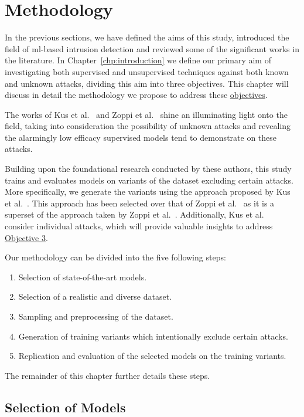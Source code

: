 \chapter{Methodology}%
\label{chp:methodology}

In the previous sections, we have defined the aims of this study, introduced
the field of \gls{ml}-based intrusion detection and reviewed some of the
significant works in the literature. In Chapter~\ref{chp:introduction} we
define our primary aim of investigating both supervised and unsupervised
techniques against both known and unknown attacks, dividing this aim into three
objectives. This chapter will discuss in detail the methodology we propose to
address these \hyperlink{obj}{objectives}.

The works of Kus et al.~\cite{Kus} and Zoppi et al.~\cite{Zoppi} shine an
illuminating light onto the field, taking into consideration the possibility of
unknown attacks and revealing the alarmingly low efficacy supervised models
tend to demonstrate on these attacks.

Building upon the foundational research conducted by these authors, this study
trains and evaluates models on variants of the dataset excluding certain
attacks. More specifically, we generate the variants using the approach
proposed by Kus et al.~\cite{Kus}. This approach has been selected over that of
Zoppi et al.~\cite{Zoppi} as it is a superset of the approach taken by Zoppi et
al.~\cite{Zoppi}. Additionally, Kus et al.~\cite{Kus} consider individual
attacks, which will provide valuable insights to address
\hyperlink{obj}{Objective 3}.

Our methodology can be divided into the five following steps:
\begin{enumerate}
      \item Selection of state-of-the-art models.
      \item Selection of a realistic and diverse dataset.
      \item Sampling and preprocessing of the dataset.
      \item Generation of training variants which intentionally exclude certain attacks.
      \item Replication and evaluation of the selected models on the training variants.
\end{enumerate}
The remainder of this chapter further details these steps.

\section{Selection of Models}%
\label{sec:models}

